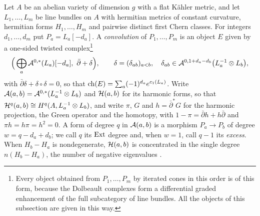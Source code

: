 \begin{setupenv}[Convolutions]\label{setup:convolution}
Let $A$ be an abelian variety of dimension $g$ with a flat K\"ahler metric,
and let $L_{1},\dots,L_{m}$ be line bundles on $A$ with hermitian metrics of
constant curvature, hermitian forms $H_{1},\dots,H_{m}$ and pairwise distinct
first Chern classes. For integers $d_{1},\dots,d_{m}$ put
$P_{a}=L_{a}[-d_{a}]$. A \emph{convolution} of $P_{1},\dots,P_{m}$ is an
object $E$ given by a one-sided twisted
complex\footnote{Every object obtained from $P_{1},\dots,P_{m}$ by iterated
cones in this order is of this form, because the Dolbeault complexes form a
differential graded enhancement of the full subcategory of line bundles. All
the objects of this subsection are given in this way.}
\[
  \Bigl(\,\bigoplus_{a}\cA^{0,*}(L_{a})[-d_{a}],\ \bar\partial+\delta\Bigr),
  \qquad
  \delta=(\delta_{ab})_{a<b},\quad
  \delta_{ab}\in\cA^{0,1+d_{a}-d_{b}}\bigl(L_{a}^{-1}\otimes L_{b}\bigr),
\]
with $\bar\partial\delta+\delta\circ\delta=0$, so that
$\operatorname{ch}(E)=\sum_{a}(-1)^{d_{a}}e^{c_{1}(L_{a})}$. Write
$\mathcal{A}(a,b)=\mathcal{A}^{0,*}(L_{a}^{-1}\otimes L_{b})$ and $\mathcal{H}(a,b)$ for its harmonic
forms, so that $\mathcal{H}^{q}(a,b)\cong H^{q}(A,L_{a}^{-1}\otimes L_{b})$, and write
$\pi$, $G$ and $h=\bar\partial^{*}G$ for the harmonic projection, the Green
operator and the homotopy, with $1-\pi=\bar\partial h+h\bar\partial$ and
$\pi h=h\pi=h^{2}=0$. A form of degree $q$ in $\mathcal{A}(a,b)$ is a morphism
$P_{a}\to P_{b}$ of degree $w=q-d_{a}+d_{b}$; we call $q$ its $\operatorname{Ext}$ degree
and, when $w=1$, call $q-1$ its \emph{excess}. When $H_{b}-H_{a}$ is
nondegenerate, $\mathcal{H}(a,b)$ is concentrated in the single degree
$n(H_{b}-H_{a})$, the number of negative eigenvalues \cite[Chapter~3]{BL04}.
\end{setupenv}

